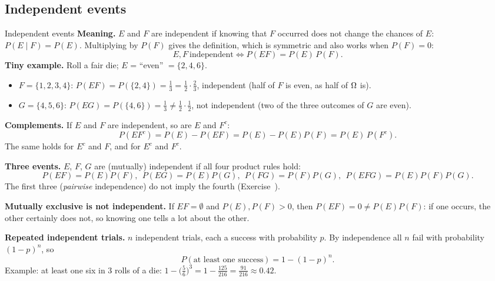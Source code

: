
\subsection*{Independent events}

\begin{key}{Independent events}
	\setlength{\parskip}{5pt}
	\textbf{Meaning.} $E$ and $F$ are independent if knowing that $F$ occurred
	does not change the chances of $E$: $P(E\mid F)=P(E)$. Multiplying by
	$P(F)$ gives the definition, which is symmetric and also works when
	$P(F)=0$:
	\[ E,F\ \text{independent}\iff P(EF)=P(E)\,P(F). \]
	\textbf{Tiny example.} Roll a fair die; $E$ = ``even'' $=\{2,4,6\}$.
	\begin{itemize}[nosep]
		\item $F=\{1,2,3,4\}$: $P(EF)=P(\{2,4\})=\frac13=\frac12\cdot\frac23$,
		      independent (half of $F$ is even, as half of $\Omega$ is).
		\item $G=\{4,5,6\}$: $P(EG)=P(\{4,6\})=\frac13\ne\frac12\cdot\frac12$,
		      not independent (two of the three outcomes of $G$ are even).
	\end{itemize}
	\textbf{Complements.} If $E$ and $F$ are independent, so are $E$ and
	$F^c$:
	\[ P(EF^c)=P(E)-P(EF)=P(E)-P(E)P(F)=P(E)\,P(F^c). \]
	The same holds for $E^c$ and $F$, and for $E^c$ and $F^c$.

	\textbf{Three events.} $E$, $F$, $G$ are (mutually) independent if all
	four product rules hold:
	\[ P(EF)=P(E)P(F),\ \ P(EG)=P(E)P(G),\ \ P(FG)=P(F)P(G),\ \
		P(EFG)=P(E)P(F)P(G). \]
	The first three (\emph{pairwise} independence) do not imply the fourth
	(Exercise~\exref{pairwise-not-mutual}).

	\textbf{Mutually exclusive is not independent.} If $EF=\emptyset$ and
	$P(E),P(F)>0$, then $P(EF)=0\ne P(E)P(F)$: if one occurs, the other
	certainly does not, so knowing one tells a lot about the other.

	\textbf{Repeated independent trials.} $n$ independent trials, each a
	success with probability $p$. By independence all $n$ fail with
	probability $(1-p)^n$, so
	\[ P(\text{at least one success})=1-(1-p)^n. \]
	Example: at least one six in 3 rolls of a die:
	$1-\big(\frac56\big)^3=1-\frac{125}{216}=\frac{91}{216}\approx0.42$.
\end{key}


